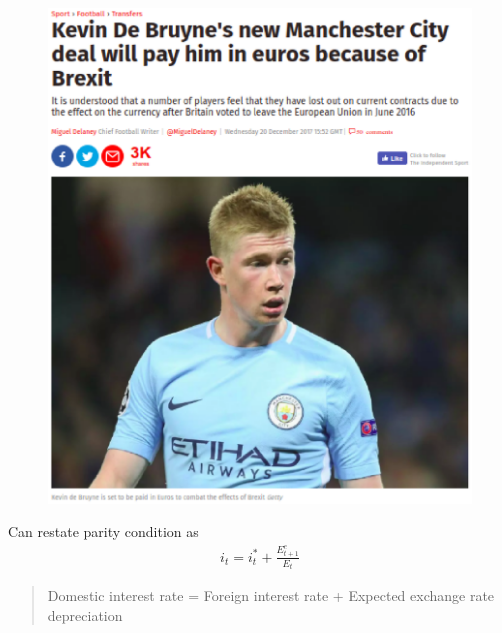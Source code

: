 \documentclass{beamer}
\begin{document}
\begin{frame}
  \begin{figure}
    \includegraphics[scale=.5]{de_bruyne.eps}
  \end{figure}
\end{frame}

\begin{frame}
  Can restate parity condition as
  \begin{align}
    i_t = i^*_t +  \frac{E^e_{t+1}}{E_t}
  \end{align}
  \begin{quote}
    Domestic interest rate = Foreign interest rate + Expected exchange rate depreciation
  \end{quote}
\end{frame}
\end{document}
